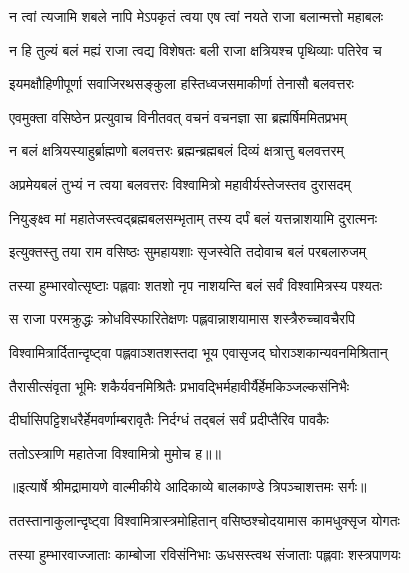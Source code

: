 \twolineshloka
{न त्वां त्यजामि शबले नापि मेऽपकृतं त्वया}
{एष त्वां नयते राजा बलान्मत्तो महाबलः} %

\twolineshloka
{न हि तुल्यं बलं मह्यं राजा त्वद्य विशेषतः}
{बली राजा क्षत्रियश्च पृथिव्याः पतिरेव च} %

\twolineshloka
{इयमक्षौहिणीपूर्णा सवाजिरथसङ्कुला}
{हस्तिध्वजसमाकीर्णा तेनासौ बलवत्तरः} %

\twolineshloka
{एवमुक्ता वसिष्ठेन प्रत्युवाच विनीतवत्}
{वचनं वचनज्ञा सा ब्रह्मर्षिममितप्रभम्} %

\twolineshloka
{न बलं क्षत्रियस्याहुर्ब्राह्मणो बलवत्तरः}
{ब्रह्मन्ब्रह्मबलं दिव्यं क्षत्रात्तु बलवत्तरम्} %

\twolineshloka
{अप्रमेयबलं तुभ्यं न त्वया बलवत्तरः}
{विश्वामित्रो महावीर्यस्तेजस्तव दुरासदम्} %

\twolineshloka
{नियुङ्क्ष्व मां महातेजस्त्वद्ब्रह्मबलसम्भृताम्}
{तस्य दर्पं बलं यत्तन्नाशयामि दुरात्मनः} %

\twolineshloka
{इत्युक्तस्तु तया राम वसिष्ठः सुमहायशाः}
{सृजस्वेति तदोवाच बलं परबलारुजम्} %

\twolineshloka
{तस्या हुम्भारवोत्सृष्टाः पह्लवाः शतशो नृप}
{नाशयन्ति बलं सर्वं विश्वामित्रस्य पश्यतः} %

\twolineshloka
{स राजा परमक्रुद्धः क्रोधविस्फारितेक्षणः}
{पह्लवान्नाशयामास शस्त्रैरुच्चावचैरपि} %

\twolineshloka
{विश्वामित्रार्दितान्दृष्ट्वा पह्लवाञ्शतशस्तदा}
{भूय एवासृजद् घोराञ्शकान्यवनमिश्रितान्} %

\twolineshloka
{तैरासीत्संवृता भूमिः शकैर्यवनमिश्रितैः}
{प्रभावद्भिर्महावीर्यैर्हेमकिञ्जल्कसंनिभैः} %

\twolineshloka
{दीर्घासिपट्टिशधरैर्हेमवर्णाम्बरावृतैः}
{निर्दग्धं तद्बलं सर्वं प्रदीप्तैरिव पावकैः} %

{ततोऽस्त्राणि महातेजा विश्वामित्रो मुमोच ह॥॥} %

\addtocounter{shlokacount}{1}


{॥इत्यार्षे श्रीमद्रामायणे वाल्मीकीये आदिकाव्ये बालकाण्डे त्रिपञ्चाशत्तमः सर्गः॥}


\twolineshloka
{ततस्तानाकुलान्दृष्ट्वा विश्वामित्रास्त्रमोहितान्}
{वसिष्ठश्चोदयामास कामधुक्सृज योगतः} %

\twolineshloka
{तस्या हुम्भारवाज्जाताः काम्बोजा रविसंनिभाः}
{ऊधसस्त्वथ संजाताः पह्लवाः शस्त्रपाणयः} %

